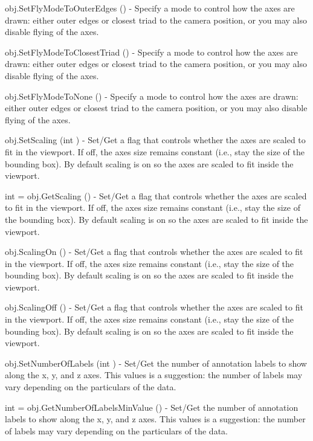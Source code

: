 \begin{DoxyItemize}
\item {\ttfamily obj.\-Set\-Fly\-Mode\-To\-Outer\-Edges ()} -\/ Specify a mode to control how the axes are drawn\-: either outer edges or closest triad to the camera position, or you may also disable flying of the axes.  
\item {\ttfamily obj.\-Set\-Fly\-Mode\-To\-Closest\-Triad ()} -\/ Specify a mode to control how the axes are drawn\-: either outer edges or closest triad to the camera position, or you may also disable flying of the axes.  
\item {\ttfamily obj.\-Set\-Fly\-Mode\-To\-None ()} -\/ Specify a mode to control how the axes are drawn\-: either outer edges or closest triad to the camera position, or you may also disable flying of the axes.  
\item {\ttfamily obj.\-Set\-Scaling (int )} -\/ Set/\-Get a flag that controls whether the axes are scaled to fit in the viewport. If off, the axes size remains constant (i.\-e., stay the size of the bounding box). By default scaling is on so the axes are scaled to fit inside the viewport.  
\item {\ttfamily int = obj.\-Get\-Scaling ()} -\/ Set/\-Get a flag that controls whether the axes are scaled to fit in the viewport. If off, the axes size remains constant (i.\-e., stay the size of the bounding box). By default scaling is on so the axes are scaled to fit inside the viewport.  
\item {\ttfamily obj.\-Scaling\-On ()} -\/ Set/\-Get a flag that controls whether the axes are scaled to fit in the viewport. If off, the axes size remains constant (i.\-e., stay the size of the bounding box). By default scaling is on so the axes are scaled to fit inside the viewport.  
\item {\ttfamily obj.\-Scaling\-Off ()} -\/ Set/\-Get a flag that controls whether the axes are scaled to fit in the viewport. If off, the axes size remains constant (i.\-e., stay the size of the bounding box). By default scaling is on so the axes are scaled to fit inside the viewport.  
\item {\ttfamily obj.\-Set\-Number\-Of\-Labels (int )} -\/ Set/\-Get the number of annotation labels to show along the x, y, and z axes. This values is a suggestion\-: the number of labels may vary depending on the particulars of the data.  
\item {\ttfamily int = obj.\-Get\-Number\-Of\-Labels\-Min\-Value ()} -\/ Set/\-Get the number of annotation labels to show along the x, y, and z axes. This values is a suggestion\-: the number of labels may vary depending on the particulars of the data.  

\end{DoxyItemize}
